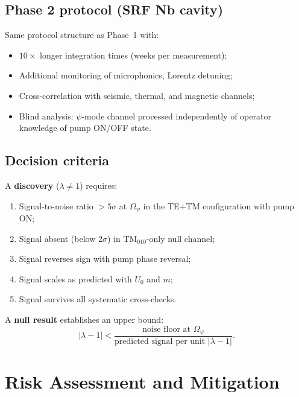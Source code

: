 \documentclass[12pt,letterpaper]{article}
\begin{document}
\subsection{Phase 2 protocol (SRF Nb cavity)}

Same protocol structure as Phase~1 with:
\begin{itemize}[noitemsep]
  \item $10\times$ longer integration times (weeks per measurement);
  \item Additional monitoring of microphonics, Lorentz detuning;
  \item Cross-correlation with seismic, thermal, and magnetic channels;
  \item Blind analysis: $\psi$-mode channel processed independently of
    operator knowledge of pump ON/OFF state.
\end{itemize}

\subsection{Decision criteria}

A \textbf{discovery} ($\lambda \neq 1$) requires:
\begin{enumerate}[noitemsep]
  \item Signal-to-noise ratio $> 5\sigma$ at $\Omega_\psi$ in the
    TE+TM configuration with pump ON;
  \item Signal absent (below $2\sigma$) in TM$_{010}$-only null channel;
  \item Signal reverses sign with pump phase reversal;
  \item Signal scales as predicted with $U_0$ and $m$;
  \item Signal survives all systematic cross-checks.
\end{enumerate}

A \textbf{null result} establishes an upper bound:
\begin{equation}
  |\lambda - 1| < \frac{\text{noise floor at } \Omega_\psi}
    {\text{predicted signal per unit } |\lambda - 1|}.
\end{equation}

\section{Risk Assessment and Mitigation}
\end{document}

